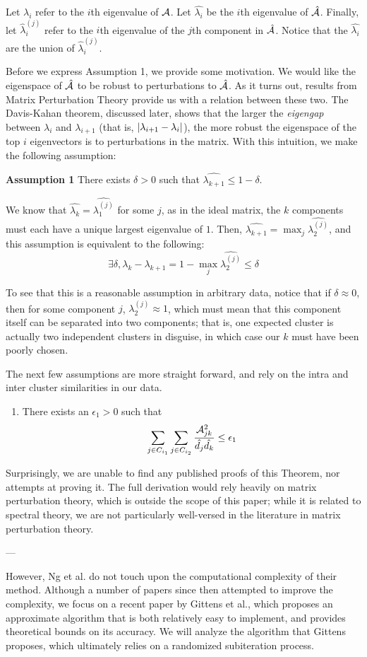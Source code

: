 Let $\lambda_i$ refer to the $i$th eigenvalue of $\mathcal{A}$. Let $\hat{\lambda_i}$
be the $i$th eigenvalue of $\hat{\mathcal{A}}$. Finally, let $\hat{\lambda}^{(j)}_i$
refer to the $i$th eigenvalue of the $j$th component in $\hat{\mathcal{A}}$. Notice that
the $\hat{\lambda_i}$ are the union of $\hat{\lambda}^{(j)}_i$.

Before we express Assumption 1, we provide some motivation. We would like
the eigenspace of $\hat{\mathcal{A}}$ to be robust to perturbations to $\hat{\mathcal{A}}$. As
it turns out, results from Matrix Perturbation Theory provide us with a relation
between these two. The Davis-Kahan theorem, discussed later, shows that the
larger the \textit{eigengap} between $\lambda_i$ and $\lambda_{i+1}$ (that is,
$\lvert\lambda_{i+1} - \lambda_i\rvert$), the more robust the eigenspace of the top
$i$ eigenvectors is to perturbations in the matrix. With this intuition, we
make the following assumption:

\textbf{Assumption 1} There exists $\delta > 0$ such that
$\hat{\lambda_{k+1}} \leq 1 - \delta$.

We know that $\hat{\lambda_k} = \hat{\lambda^{(j)}_1}$ for some $j$, as in the
ideal matrix, the $k$ components must each have a unique largest eigenvalue of
$1$. Then, $\hat{\lambda_{k+1}} = \max_j \hat{\lambda^{(j)}_2}$, and this
assumption is equivalent to the following:
\[ \exists \delta, \lambda_k - \lambda_{k+1} = 1 - \max_j \hat{\lambda^{(j)}_2} \leq \delta \]

To see that this is a reasonable assumption in arbitrary data, notice that if
$\delta \approx 0$, then for some component $j$, $\lambda^{(j)}_2 \approx 1$,
which must mean that this component itself can be separated into two components;
that is, one expected cluster is actually two independent clusters in disguise,
in which case our $k$ must have been poorly chosen.

The next few assumptions are more straight forward, and rely on the intra and
inter cluster similarities in our data.
\begin{enumerate}
\item
    There exists an $\epsilon_1 > 0$ such that
    \[ \sum_{j \in C_{i_1}} \sum_{j \in C_{i_2}} \frac{\mathcal{A}_{jk}^2}{\hat{d_j} \hat{d_k}} \leq \epsilon_1 \]
\end{enumerate}

Surprisingly, we are unable to find any published proofs of this Theorem, nor
attempts at proving it. The full derivation would rely heavily on matrix
perturbation theory, which is outside the scope of this paper; while it is
related to spectral theory, we are not particularly well-versed in the
literature in matrix perturbation theory.

---

However, Ng et al. do not touch upon the computational complexity of their
method. Although a number of papers since then attempted to improve the
complexity, we focus on a recent paper by Gittens et
al.\cite{gittens2013approximate}, which proposes an approximate algorithm that
is both relatively easy to implement, and provides theoretical bounds on its
accuracy. We will analyze the algorithm that Gittens proposes, which ultimately
relies on a randomized subiteration process.
